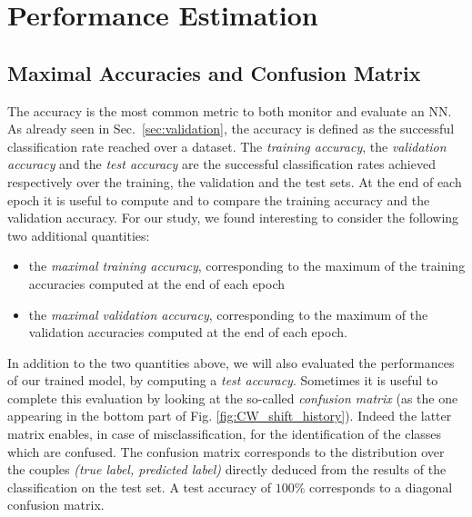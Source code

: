 \section{Performance Estimation}\label{sec:performances_NN}
\subsection{Maximal Accuracies and Confusion Matrix} 
The accuracy is the most common metric to both monitor and evaluate an NN. As already seen in Sec.~\ref{sec:validation}, the accuracy is defined as the successful classification rate reached over a dataset. The {\em training accuracy}, the \emph{validation accuracy} and the \emph{test accuracy} are the successful classification rates achieved respectively over the training, the validation and the test sets. At the end of each epoch it is useful to compute and to compare the training accuracy and the validation accuracy. For our study, we found interesting to consider the following two additional quantities: 
\begin{itemize}
\item the \emph{maximal training accuracy}, corresponding to the maximum of the training accuracies computed at the end of each epoch
\item the \emph{maximal validation accuracy}, corresponding to the maximum of the validation accuracies computed at the end of each epoch.
\end{itemize}
In addition to the two quantities above, we will also evaluated the performances of our trained model, by computing a \emph{test accuracy}. Sometimes it is useful to complete this evaluation by looking at the so-called \emph{confusion matrix} (as the one appearing in the bottom part of Fig. \ref{fig:CW_shift_history}). Indeed the latter matrix enables, in case of misclassification, for the identification of the classes which are confused. The confusion matrix corresponds to the distribution over the couples \emph{(true label, predicted label)} directly deduced from the results of the classification on the test set. A test accuracy of $100\%$ corresponds to a diagonal confusion matrix.\\

